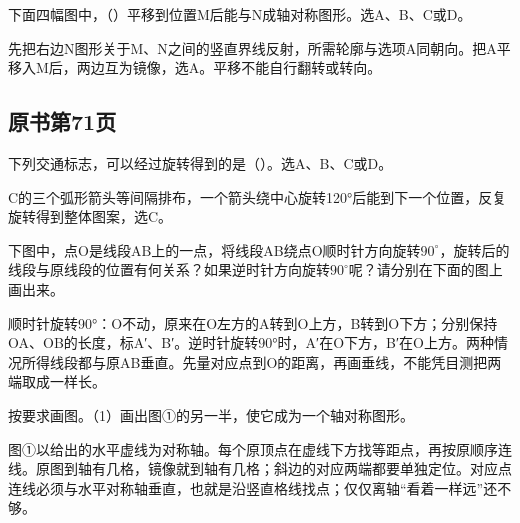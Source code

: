 下面四幅图中，（\hspace{1.8em}）平移到位置M后能与N成轴对称图形。选A、B、C或D。\par
{}
\begin{BookAnswer}
先把右边N图形关于M、N之间的竖直界线反射，所需轮廓与选项A同朝向。把A平移入M后，两边互为镜像，选A。平移不能自行翻转或转向。
\end{BookAnswer}



\subsection*{原书第71页}

下列交通标志，可以经过旋转得到的是（\hspace{1.8em}）。选A、B、C或D。\par
{}
\begin{BookAnswer}
C的三个弧形箭头等间隔排布，一个箭头绕中心旋转120°后能到下一个位置，反复旋转得到整体图案，选C。
\end{BookAnswer}

下图中，点O是线段AB上的一点，将线段AB绕点O顺时针方向旋转\(90^\circ\)，旋转后的线段与原线段的位置有何关系？如果逆时针方向旋转\(90^\circ\)呢？请分别在下面的图上画出来。\par
{}
\begin{BookAnswer}
顺时针旋转90°：O不动，原来在O左方的A转到O上方，B转到O下方；分别保持OA、OB的长度，标A′、B′。逆时针旋转90°时，A′在O下方，B′在O上方。两种情况所得线段都与原AB垂直。先量对应点到O的距离，再画垂线，不能凭目测把两端取成一样长。
\end{BookAnswer}

按要求画图。（1）画出图①的另一半，使它成为一个轴对称图形。\par
{}
\begin{BookAnswer}
图①以给出的水平虚线为对称轴。每个原顶点在虚线下方找等距点，再按原顺序连线。原图到轴有几格，镜像就到轴有几格；斜边的对应两端都要单独定位。对应点连线必须与水平对称轴垂直，也就是沿竖直格线找点；仅仅离轴“看着一样远”还不够。
\end{BookAnswer}

